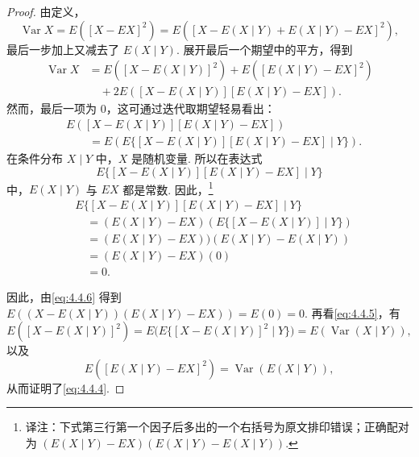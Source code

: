 \begin{proof}
由定义，
$$\operatorname{Var}X=E([X-EX]^2)=E([X-E(X\mid Y)+E(X\mid Y)-EX]^2),$$
最后一步加上又减去了 $E(X\mid Y)$. 展开最后一个期望中的平方，得到
\begin{equation}\label{eq:4.4.5}
\begin{aligned}
\operatorname{Var}X&=E([X-E(X\mid Y)]^2)+E([E(X\mid Y)-EX]^2)\\
&\quad+2E([X-E(X\mid Y)][E(X\mid Y)-EX]).
\end{aligned}
\end{equation}
然而，最后一项为 0，这可通过迭代取期望轻易看出：
\begin{equation}\label{eq:4.4.6}
\begin{aligned}
&E([X-E(X\mid Y)][E(X\mid Y)-EX])\\
&\qquad=E(E\{[X-E(X\mid Y)][E(X\mid Y)-EX]\mid Y\}).
\end{aligned}
\end{equation}
在条件分布 $X\mid Y$ 中，$X$ 是随机变量. 所以在表达式
$$E\{[X-E(X\mid Y)][E(X\mid Y)-EX]\mid Y\}$$
中，$E(X\mid Y)$ 与 $EX$ 都是常数. 因此，\footnote{译注：下式第三行第一个因子后多出的一个右括号为原文排印错误；正确配对为 $(E(X\mid Y)-EX)(E(X\mid Y)-E(X\mid Y))$.}
$$\begin{aligned}
&E\{[X-E(X\mid Y)][E(X\mid Y)-EX]\mid Y\}\\
&\quad=(E(X\mid Y)-EX)(E\{[X-E(X\mid Y)]\mid Y\})\\
&\quad=(E(X\mid Y)-EX))(E(X\mid Y)-E(X\mid Y))\\
&\quad=(E(X\mid Y)-EX)(0)\\
&\quad=0.
\end{aligned}$$

因此，由\eqref{eq:4.4.6} 得到 $E((X-E(X\mid Y))(E(X\mid Y)-EX))=E(0)=0$. 再看\eqref{eq:4.4.5}，有
$$E([X-E(X\mid Y)]^2)=E\bigl(E\{[X-E(X\mid Y)]^2\mid Y\}\bigr)=E(\operatorname{Var}(X\mid Y)),$$
以及
$$E([E(X\mid Y)-EX]^2)=\operatorname{Var}(E(X\mid Y)),$$
从而证明了\eqref{eq:4.4.4}.
\end{proof}

